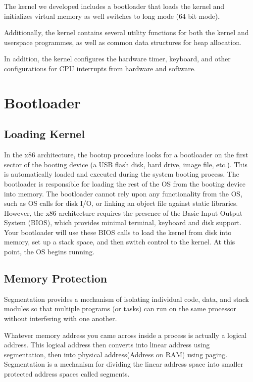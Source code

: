 \documentclass[12pt]{report}
\begin{document}
	The kernel we developed includes a bootloader that loads the kernel and initializes virtual memory
	as well switches to long mode (64 bit mode).
	
	Additionally, the kernel contains several utility functions for both the kernel and userspace programmes, 
	as well as common data structures for heap allocation. 
	
	In addition, the kernel configures the hardware timer, keyboard, and other configurations for CPU interrupts 
	from hardware and software.

    \section{Bootloader}
    \subsection{Loading Kernel}
    In the x86 architecture, the bootup procedure looks for a bootloader on
    the first sector of the booting device (a USB flash disk, hard drive, image
    file, etc.). This is automatically loaded and executed during the system
    booting process. The bootloader is responsible for loading the rest of the
    OS from the booting device into memory. The bootloader cannot rely upon
    any functionality from the OS, such as OS calls for disk I/O, or linking an
    object file against static libraries. However, the x86 architecture requires the
    presence of the Basic Input Output System (BIOS), which provides minimal
    terminal, keyboard and disk support. Your bootloader will use these BIOS
    calls to load the kernel from disk into memory, set up a stack space, and then
    switch control to the kernel. At this point, the OS begins running.

    \subsection{Memory Protection}
    Segmentation provides a mechanism of isolating individual code, data, and   
    stack modules so that multiple programs (or tasks) can run on the same processor 
    without interfering with one another.

    Whatever memory address you came across inside a process is actually a logical address. 
    This logical address then converts into linear address using segmentation, then into physical
    address(Address on RAM) using paging. Segmentation is a mechanism for
    dividing the linear address space into smaller protected address spaces called
    segments.
\end{document}
